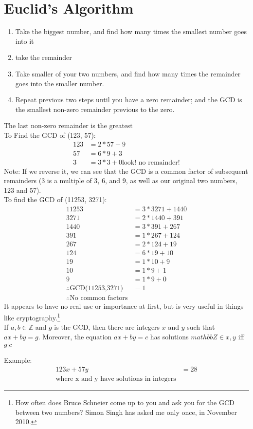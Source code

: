 \section{Euclid's Algorithm}
\label{sec:EuclidsAlgorithm}
\begin{enumerate}
  \item Take the biggest number, and find how many times the smallest number
  goes into it
  \item take the remainder
  \item Take smaller of your two numbers, and find how many times the
  remainder goes into the smaller number.
  \item Repeat previous two steps until you have a zero remainder; and the GCD
  is the smallest non-zero remainder previous to the zero.
\end{enumerate}
The last non-zero remainder is the greatest
\\
To Find the GCD of (123, 57):
\begin{align}
  123 & = 2 * 57 + 9 \\
   57 & = 6 * 9 + 3 \\
    3 & = 3 * 3 + 0 \text{look! no remainder!}
\end{align}
Note: If we reverse it, we can see that the GCD is a common factor of subsequent
remainders (3 is a multiple of 3, 6, and 9, as well as our original two
numbers, 123 and 57).
\\
To find the GCD of (11253, 3271):
\begin{align}
  11253 & = 3 * 3271 + 1440 \\
   3271 & = 2 * 1440 + 391 \\
   1440 & = 3 * 391 + 267 \\
    391 & = 1 * 267 + 124 \\
    267 & = 2 * 124 + 19 \\
    124 & = 6 * 19 + 10 \\
     19 & = 1 * 10 + 9 \\
     10 & = 1 * 9 + 1 \\
      9 & = 1 * 9 + 0 \\
      \therefore \text{GCD(11253,3271)} & = 1 \\
      \therefore \text{No common factors}
\end{align}
It appears to have no real use or importance at first, but is very
useful in things like cryptography.\footnote{How often does Bruce Schneier come
up to you and ask you for the GCD between two numbers? Simon Singh has asked me
only once, in November 2010.}
\\
If $a, b \in \mathbb{Z}$ and $g$ is the GCD, then there are integers $x$ and $y$
such that $ax + by = g$. Moreover, the equation $ax + by = c$ has solutions
$mathbb{Z} \in x,y$ iff $g|c$

Example:
\begin{align}
  123x + 57y & = 28 \\
  \text{where x and y have solutions in integers}
\end{align}